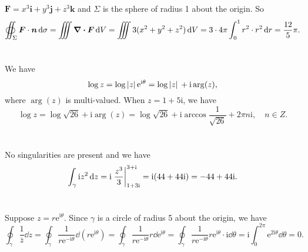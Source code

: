 \documentclass[hyperref, a4paper]{article}
\newcommand*{\ii}{\mathrm{i}}
\newcommand*{\ee}{\mathrm{e}}
\def\mathbb#1{#1}%
\begin{document}
\section{}

$\mathbf{F}=x^3 \mathbf{i}+y^3 \mathbf{j}+z^3 \mathbf{k}$ and $\Sigma$ is the sphere of radius 1 about the origin.
So 
\begin{equation}
    \oiint_\Sigma\vb*{F} \cdot \vb*{n} \dd{\sigma}
    = \iiint \div{\vb*{F}} \dd{V}
    = \iiint 3 (x^2 + y^2 + z^2) \dd{V}
    = 3 \cdot 4 \pi \int_{0}^{1} r^2 \cdot r^2 \dd{r}
    = \frac{12}{5} \pi.
\end{equation}

\section{}

We have 
\begin{equation}
    \log z = \log \abs*{z} \ee^{\ii \theta}
    = \log \abs*{z} + \ii \arg(z),
\end{equation}
where $\arg(z)$ is multi-valued.
When $z = 1 + 5 \ii$, we have 
\begin{equation}
    \log z = \log \sqrt{26} + \ii \arg(z)
    = \log \sqrt{26} + \ii \arccos \frac{1}{\sqrt{26}} + 2 \pi n \ii, \quad 
    n \in \mathbb{Z}.
\end{equation}

\section{}

No singularities are present and we have 
\begin{equation}
    \int_\gamma \ii z^2 \dd{z} = \ii \eval{\frac{z^3}{3} }^{3 + \ii}_{1 + 3 \ii}
    = \ii (44 + 44 \ii) = - 44 + 44 \ii.
\end{equation}

\section{}

Suppose $z = r \ee^{\ii \theta}$. 
Since $\gamma$ is a circle of radius 5 about the origin,
we have 
\begin{equation}
    \oint_\gamma \frac{1}{\bar{z}} \dd{z} 
    = \oint_\gamma \frac{1}{r \ee^{- \ii \theta}} \dd{(r \ee^{\ii \theta})}
    = \oint_\gamma \frac{1}{r \ee^{- \ii \theta}} r \dd{ \ee^{\ii \theta}}
    = \oint_\gamma \frac{1}{r \ee^{- \ii \theta}} r  \ee^{\ii \theta} \cdot \ii \dd{\theta}
    = \ii \int_{0}^{2\pi} \ee^{2 \ii \theta} \dd{\theta}
    = 0.
\end{equation}
\end{document}
